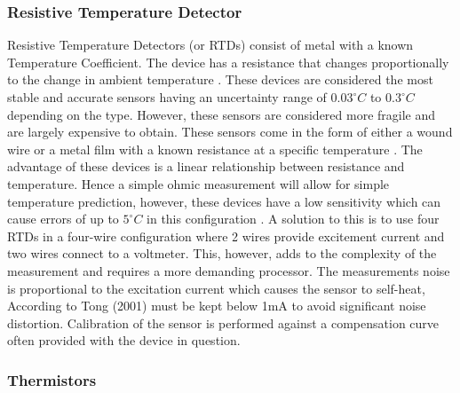 \subsubsection{Resistive Temperature Detector}
 
 Resistive Temperature Detectors (or RTDs) consist of metal with a known Temperature Coefficient. The device has a resistance that changes proportionally to the change in ambient temperature \cite{tong2001improving}. These devices are considered the most stable and accurate sensors \cite{tong2001improving} having an uncertainty range of $0.03^\circ C$ to $0.3^\circ C$ depending on the type. However, these sensors are considered more fragile and are largely expensive to obtain. These sensors come in the form of either a wound wire or a metal film with a known resistance at a specific temperature \cite{tong2001improving}. The advantage of these devices is a linear relationship between resistance and temperature. Hence a simple ohmic measurement \cite{tong2001improving} will allow for simple temperature prediction, however, these devices have a low sensitivity which can cause errors of up to $5 ^\circ C$ in this configuration \cite{tong2001improving}. A solution to this is to use four RTDs in a four-wire configuration where 2 wires provide excitement current and two wires connect to a voltmeter. This, however, adds to the complexity of the measurement and requires a more demanding processor. The measurements noise is proportional to the excitation current which causes the sensor to self-heat, According to Tong (2001) must be kept below 1mA to avoid significant noise distortion. Calibration of the sensor is performed against a compensation curve often provided with the device in question.
 \subsubsection{Thermistors}
 
